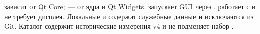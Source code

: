 зависит от Qt Core;  --- от ядра и Qt Widgets.  запускает GUI через .  работает с  и не требует дисплея. Локальные  и  содержат служебные данные и исключаются из Git. Каталог  содержит исторические измерения v4 и не подменяет набор .
